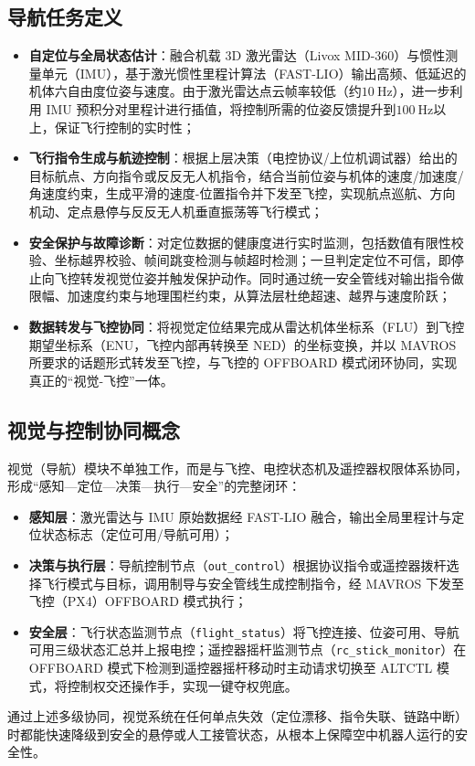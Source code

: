 \subsection{导航任务定义}
\begin{itemize}
    \item \textbf{自定位与全局状态估计}：融合机载 3D 激光雷达（Livox MID-360）与惯性测量单元（IMU），基于激光惯性里程计算法（FAST-LIO）输出高频、低延迟的机体六自由度位姿与速度。由于激光雷达点云帧率较低（约$\qty{10}{\Hz}$），进一步利用 IMU 预积分对里程计进行插值，将控制所需的位姿反馈提升到$\qty{100}{\Hz}$以上，保证飞行控制的实时性；
    \item \textbf{飞行指令生成与航迹控制}：根据上层决策（电控协议/上位机调试器）给出的目标航点、方向指令或反反无人机指令，结合当前位姿与机体的速度/加速度/角速度约束，生成平滑的速度-位置指令并下发至飞控，实现航点巡航、方向机动、定点悬停与反反无人机垂直振荡等飞行模式；
    \item \textbf{安全保护与故障诊断}：对定位数据的健康度进行实时监测，包括数值有限性校验、坐标越界校验、帧间跳变检测与帧超时检测；一旦判定定位不可信，即停止向飞控转发视觉位姿并触发保护动作。同时通过统一安全管线对输出指令做限幅、加速度约束与地理围栏约束，从算法层杜绝超速、越界与速度阶跃；
    \item \textbf{数据转发与飞控协同}：将视觉定位结果完成从雷达机体坐标系（FLU）到飞控期望坐标系（ENU，飞控内部再转换至 NED）的坐标变换，并以 MAVROS 所要求的话题形式转发至飞控，与飞控的 OFFBOARD 模式闭环协同，实现真正的“视觉-飞控”一体。
\end{itemize}

\subsection{视觉与控制协同概念}
视觉（导航）模块不单独工作，而是与飞控、电控状态机及遥控器权限体系协同，形成“感知—定位—决策—执行—安全”的完整闭环：
\begin{itemize}
    \item \textbf{感知层}：激光雷达与 IMU 原始数据经 FAST-LIO 融合，输出全局里程计与定位状态标志（定位可用/导航可用）；
    \item \textbf{决策与执行层}：导航控制节点（\lstinline{out_control}）根据协议指令或遥控器拨杆选择飞行模式与目标，调用制导与安全管线生成控制指令，经 MAVROS 下发至飞控（PX4）OFFBOARD 模式执行；
    \item \textbf{安全层}：飞行状态监测节点（\lstinline{flight_status}）将飞控连接、位姿可用、导航可用三级状态汇总并上报电控；遥控器摇杆监测节点（\lstinline{rc_stick_monitor}）在 OFFBOARD 模式下检测到遥控器摇杆移动时主动请求切换至 ALTCTL 模式，将控制权交还操作手，实现一键夺权兜底。
\end{itemize}
通过上述多级协同，视觉系统在任何单点失效（定位漂移、指令失联、链路中断）时都能快速降级到安全的悬停或人工接管状态，从根本上保障空中机器人运行的安全性。
